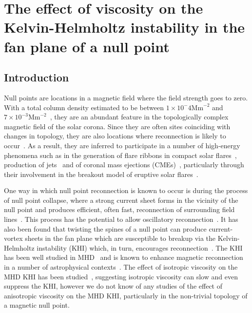 \chapter{The effect of viscosity on the Kelvin-Helmholtz instability in the fan plane of a null point}
\label{chp:null_point_khi}

\graphicspath{{images/null_point_khi/}}

\section{Introduction}

Null points are locations in a magnetic field where the field strength goes to zero. With a total column density estimated to be between $1\times 10^-4 \text{Mm}^{-2}$ and $7\times 10^{-3} \text{Mm}^{-2}$~\cite{edwardsNullPointDistribution2015}, they are an abundant feature in the topologically complex magnetic field of the solar corona. Since they are often sites coinciding with changes in topology, they are also locations where reconnection is likely to occur~\cite{yangImagingSpectralStudy2020,sunHOTSPINELOOPS2013}. As a result, they are inferred to participate in a number of high-energy phenomena such as in the generation of flare ribbons in compact solar flares~\cite{massonNATUREFLARERIBBONS2009,pontinWhyAreFlare2016a}, production of jets~\cite{moreno-insertisPLASMAJETSERUPTIONS2013} and of coronal mass ejections (CMEs)~\cite{barnesRelationshipCoronalMagnetic2007,zouContinuousNullPointMagnetic2020}, particularly through their involvement in the breakout model of eruptive solar flares~\cite{macleanTopologicalAnalysisMagnetic2005}.

One way in which null point reconnection is known to occur is during the process of null point collapse, where a strong current sheet forms in the vicinity of the null point and produces efficient, often fast, reconnection of surrounding field lines~\cite{thurgoodImplosiveCollapseMagnetic2018}. This process has the potential to allow oscillatory reconnection~\cite{thurgoodThreedimensionalOscillatoryMagnetic2017}. It has also been found that twisting the spines of a null point can produce current-vortex sheets in the fan plane which are susceptible to breakup via the Kelvin-Helmholtz instability (KHI) which, in turn, encourages reconnection~\cite{wyperKelvinHelmholtzInstabilityCurrentvortex2013}. The KHI has been well studied in MHD~\cite{chandrasekharHydrodynamicHydromagneticStability1981,einaudiResistiveInstabilitiesFlowing1986} and is known to enhance magnetic reconnection in a number of astrophysical contexts~\cite{minEffectsMagneticReconnection1997,kowalKelvinHelmholtzTearingInstability2020}. The effect of isotropic viscosity on the MHD KHI has been studied~\cite{howsonEffectsResistivityViscosity2017,roedigerViscousKelvinHelmholtzInstabilities2013a,wyperKelvinHelmholtzInstabilityCurrentvortex2013}, suggesting isotropic viscosity can slow and even suppress the KHI, however we do not know of any studies of the effect of anisotropic viscosity on the MHD KHI, particularly in the non-trivial topology of a magnetic null point.

